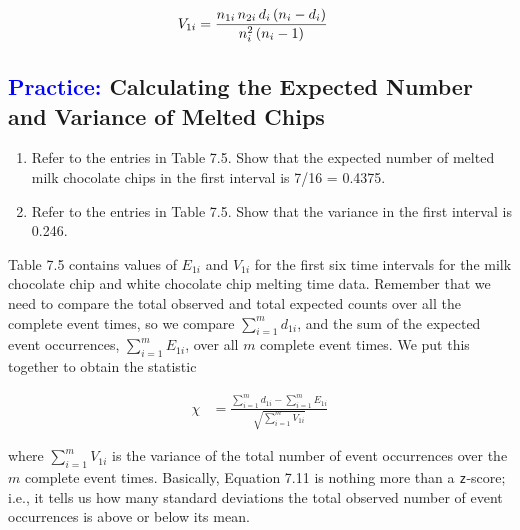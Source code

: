 \documentclass[
]{report}
\begin{document}
\begin{align}
V_{1i} &= \frac{n_{1i}\,n_{2i}\,d_i\,(n_i - d_i)}{n_i^2\,(n_i - 1)}
\notag
\end{align}

\hypertarget{calculating-the-expected-number-and-variance-of-melted-chips}{%
\subsection*{\texorpdfstring{\textcolor{blue}{Practice:} Calculating the Expected Number and Variance of Melted Chips}{ Calculating the Expected Number and Variance of Melted Chips}}\label{calculating-the-expected-number-and-variance-of-melted-chips}}

\begin{enumerate}
\def\labelenumi{\arabic{enumi}.}
\setcounter{enumi}{31}
\item
  Refer to the entries in Table 7.5. Show that the expected number of melted milk chocolate chips in the first interval is 7/16 = 0.4375.
\item
  Refer to the entries in Table 7.5. Show that the variance in the first interval is 0.246.
\end{enumerate}

Table 7.5 contains values of \(\scriptstyle E_{1i}\) and \(\scriptstyle V_{1i}\) for the first six time intervals for the milk chocolate chip and white chocolate chip melting time data. Remember that we need to compare the total observed and total expected counts over all the complete event times, so we compare \(\scriptstyle \sum_{i=1}^m d_{1i}\), and the sum of the expected event occurrences, \(\scriptstyle \sum_{i=1}^m E_{1i}\), over all \(\scriptstyle m\) complete event times. We put this together to obtain the statistic

\begin{align}\label{9.11}
\chi &= \frac{\sum_{i=1}^m d_{1i} - \sum_{i=1}^m E_{1i}}{\sqrt{\sum_{i=1}^m V_{1i}}}
\tag{7.11}
\end{align}

where \(\scriptstyle \sum_{i=1}^m V_{1i}\) is the variance of the total number of event occurrences over the \(\scriptstyle m\) complete event times. Basically, Equation 7.11 is nothing more than a \texttt{z}-score; i.e., it tells us how many standard deviations the total observed number of event occurrences is above or below its mean.
\end{document}
